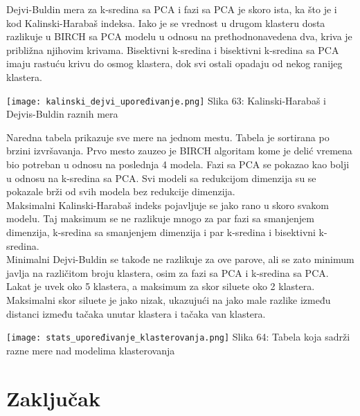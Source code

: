 \documentclass[a4paper]{article}
\begin{document}
{Dejvi-Buldin mera za k-sredina sa PCA i fazi sa PCA je skoro ista, ka što je i kod Kalinski-Harabaš indeksa. Iako je se vrednost u drugom klasteru dosta razlikuje u BIRCH sa PCA modelu u odnosu na prethodnonavedena dva, kriva je približna njihovim krivama. Bisektivni k-sredina i bisektivni k-sredina sa PCA imaju rastuću krivu do osmog klastera, dok svi ostali opadaju od nekog ranijeg klastera.

\noindent\begin{minipage}{0.9\textwidth}
\texttt{[image: kalinski\_dejvi\_upoređivanje.png]}
\hphantom{aaaaaaaaaaaaa}Slika 63: Kalinski-Harabaš i Dejvis-Buldin raznih mera\\
\end{minipage}

Naredna tabela prikazuje sve mere na jednom mestu. Tabela je sortirana po brzini izvršavanja. Prvo mesto zauzeo je BIRCH algoritam kome je delić vremena bio potreban u odnosu na poslednja 4 modela. Fazi sa PCA se pokazao kao bolji u odnosu na k-sredina sa PCA. Svi modeli sa redukcijom dimenzija su se pokazale brži od svih modela bez redukcije dimenzija.\\

Maksimalni Kalinski-Harabaš indeks pojavljuje se jako rano u skoro svakom modelu. Taj maksimum se ne razlikuje mnogo za par fazi sa smanjenjem dimenzija, k-sredina sa smanjenjem dimenzija i par k-sredina i bisektivni k-sredina.\\

Minimalni Dejvi-Buldin se takođe ne razlikuje za ove parove, ali se zato minimum javlja na različitom broju klastera, osim za fazi sa PCA i k-sredina sa PCA.\\

Lakat je uvek oko 5 klastera, a maksimum za skor siluete oko 2 klastera. Maksimalni skor siluete je jako nizak, ukazujući na jako male razlike između distanci između tačaka unutar klastera i tačaka van klastera.\\

\noindent\begin{minipage}{1.0\textwidth}
\texttt{[image: stats\_upoređivanje\_klasterovanja.png]}
\hphantom{aaaaaaaaa}Slika 64: Tabela koja sadrži razne mere nad modelima klasterovanja\\
\end{minipage}

\section{Zaključak}
\label{sec:zakljucak}

}
\end{document}
